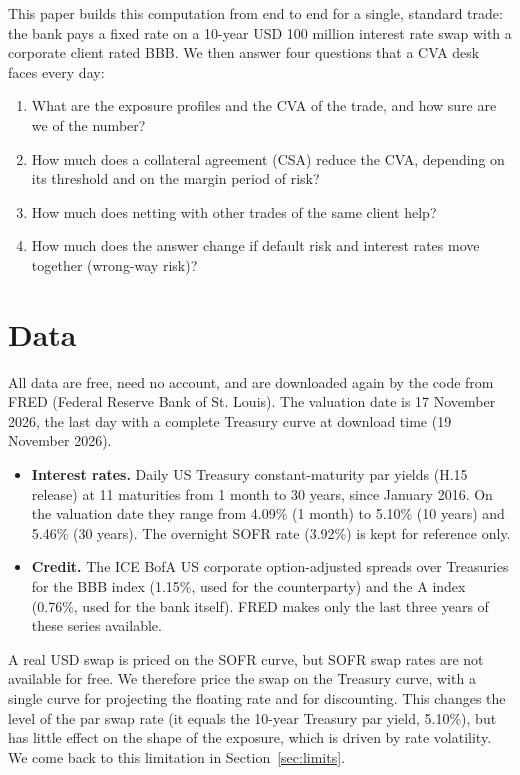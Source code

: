 \documentclass[11pt,a4paper]{article}
\begin{document}
This paper builds this computation from end to end for a single, standard trade: the bank pays a fixed rate on a 10-year USD 100 million interest rate swap with a corporate client rated BBB. We then answer four questions that a CVA desk faces every day:
\begin{enumerate}
  \item What are the exposure profiles and the CVA of the trade, and how sure are we of the number?
  \item How much does a collateral agreement (CSA) reduce the CVA, depending on its threshold and on the margin period of risk?
  \item How much does netting with other trades of the same client help?
  \item How much does the answer change if default risk and interest rates move together (wrong-way risk)?
\end{enumerate}

\section{Data}

All data are free, need no account, and are downloaded again by the code from FRED (Federal Reserve Bank of St. Louis). The valuation date is 17 November 2026, the last day with a complete Treasury curve at download time (19 November 2026).

\begin{itemize}
  \item \textbf{Interest rates.} Daily US Treasury constant-maturity par yields (H.15 release) at 11 maturities from 1 month to 30 years, since January 2016. On the valuation date they range from 4.09\% (1 month) to 5.10\% (10 years) and 5.46\% (30 years). The overnight SOFR rate (3.92\%) is kept for reference only.
  \item \textbf{Credit.} The ICE BofA US corporate option-adjusted spreads over Treasuries for the BBB index (1.15\%, used for the counterparty) and the A index (0.76\%, used for the bank itself). FRED makes only the last three years of these series available.
\end{itemize}

A real USD swap is priced on the SOFR curve, but SOFR swap rates are not available for free. We therefore price the swap on the Treasury curve, with a single curve for projecting the floating rate and for discounting. This changes the level of the par swap rate (it equals the 10-year Treasury par yield, 5.10\%), but has little effect on the shape of the exposure, which is driven by rate volatility. We come back to this limitation in Section~\ref{sec:limits}.
\end{document}
